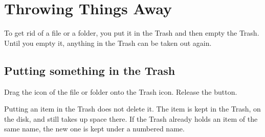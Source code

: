 \chapter{Throwing Things Away}
\label{ch:trash}

To get rid of a file or a folder, you put it in the Trash and then empty
the Trash.  Until you empty it, anything in the Trash can be taken out
again.

\section{Putting something in the Trash}
\begin{TaskSteps}
\Step Drag the icon of the file or folder onto the Trash icon.
\Step Release the button.
\end{TaskSteps}


Putting an item in the Trash does not delete it.  The item is kept in the
Trash, on the disk, and still takes up space there.  If the Trash already
holds an item of the same name, the new one is kept under a numbered name.

